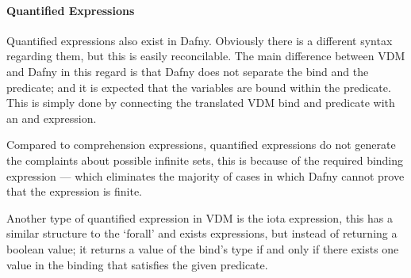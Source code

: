 \documentclass{entcs}
\begin{document}

\paragraph{Quantified Expressions}

Quantified expressions also exist in Dafny. Obviously there is a different syntax regarding them, but this is easily reconcilable. The main difference between VDM and Dafny in this regard is that Dafny does not separate the bind and the predicate; and it is expected that the variables are bound within the predicate. This is simply done by connecting the translated VDM bind and predicate with an and expression. 

Compared to comprehension expressions, quantified expressions do not generate the complaints about possible infinite sets, this is because of the required binding expression --- which eliminates the majority of cases in which Dafny cannot prove that the expression is finite.

Another type of quantified expression in VDM is the iota expression, this has a similar structure to the `forall' and exists expressions, but instead of returning a boolean value; it returns a value of the bind's type if and only if there exists one value in the binding that satisfies the given predicate. 
\end{document}
